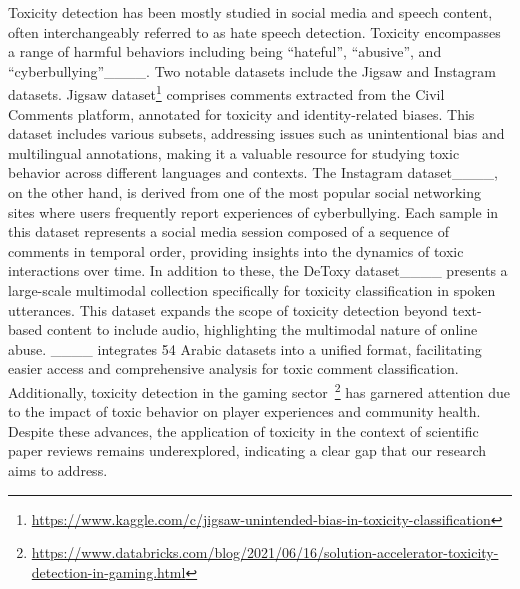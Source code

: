 
Toxicity detection has been mostly studied  in social media and speech content, often interchangeably referred to as hate speech detection. 
Toxicity encompasses a range of harmful behaviors including being ``hateful'', ``abusive'', and ``cyberbullying''____. 
Two notable datasets include the Jigsaw and Instagram datasets. 
Jigsaw dataset\footnote{\url{https://www.kaggle.com/c/jigsaw-unintended-bias-in-toxicity-classification}} comprises comments extracted from the Civil Comments platform, annotated for toxicity and identity-related biases. This dataset includes various subsets, addressing issues such as unintentional bias and multilingual annotations, making it a valuable resource for studying toxic behavior across different languages and contexts. 
The Instagram dataset____, on the other hand, is derived from one of the most popular social networking sites where users frequently report experiences of cyberbullying. Each sample in this dataset represents a social media session composed of a sequence of comments in temporal order, providing insights into the dynamics of toxic interactions over time. In addition to these, the DeToxy dataset____ presents a large-scale multimodal collection specifically for toxicity classification in spoken utterances. This dataset expands the scope of toxicity detection beyond text-based content to include audio, highlighting the multimodal nature of online abuse. ____ integrates 54 Arabic datasets into a unified format, facilitating easier access and comprehensive analysis for toxic comment classification. 
Additionally, toxicity detection in the gaming sector~\footnote{\url{https://www.databricks.com/blog/2021/06/16/solution-accelerator-toxicity-detection-in-gaming.html}} has garnered attention due to the impact of toxic behavior on player experiences and community health. Despite these advances, the application of toxicity  in the context of scientific paper reviews remains underexplored, indicating a clear gap that our research aims to address.




